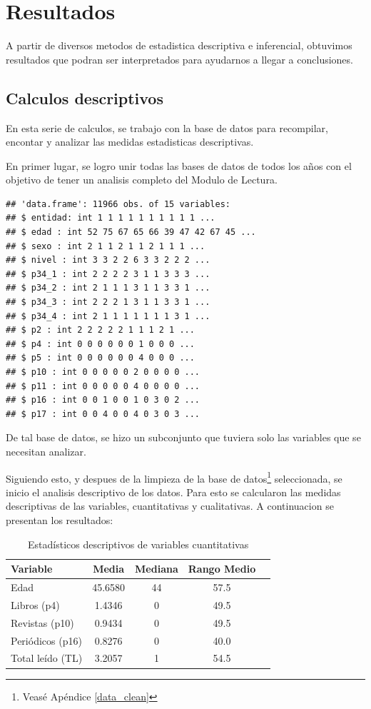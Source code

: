 \documentclass[aps,reprint]{revtex4-2}
\begin{document}
 

\section{Resultados}
A partir de diversos metodos de estadistica descriptiva e inferencial, obtuvimos resultados que podran ser interpretados para ayudarnos a llegar a conclusiones.

\subsection{Calculos descriptivos}

En esta serie de calculos, se trabajo con la base de datos para recompilar, encontar y analizar las medidas estadisticas descriptivas.

En primer lugar, se logro unir todas las bases de datos de todos los años con el objetivo de tener un analisis completo del Modulo de Lectura.

\begin{lstlisting}
## 'data.frame': 11966 obs. of 15 variables:
## $ entidad: int 1 1 1 1 1 1 1 1 1 1 ...
## $ edad : int 52 75 67 65 66 39 47 42 67 45 ...
## $ sexo : int 2 1 1 2 1 1 2 1 1 1 ...
## $ nivel : int 3 3 2 2 6 3 3 2 2 2 ...
## $ p34_1 : int 2 2 2 2 3 1 1 3 3 3 ...
## $ p34_2 : int 2 1 1 1 3 1 1 3 3 1 ...
## $ p34_3 : int 2 2 2 1 3 1 1 3 3 1 ...
## $ p34_4 : int 2 1 1 1 1 1 1 1 3 1 ...
## $ p2 : int 2 2 2 2 2 1 1 1 2 1 ...
## $ p4 : int 0 0 0 0 0 0 1 0 0 0 ...
## $ p5 : int 0 0 0 0 0 0 4 0 0 0 ...
## $ p10 : int 0 0 0 0 0 2 0 0 0 0 ...
## $ p11 : int 0 0 0 0 0 4 0 0 0 0 ...
## $ p16 : int 0 0 1 0 0 1 0 3 0 2 ...
## $ p17 : int 0 0 4 0 0 4 0 3 0 3 ...
\end{lstlisting}

De tal base de datos, se hizo un subconjunto que tuviera solo las variables que se necesitan analizar.

Siguiendo esto, y despues de la limpieza de la base de datos\footnote{Veasé Apéndice \ref{data_clean}} seleccionada, se inicio el analisis descriptivo de los datos. Para esto se calcularon las medidas descriptivas de las variables, cuantitativas y cualitativas. A continuacion se presentan los resultados:

\begin{table}[H]
\centering
\caption{Estadísticos descriptivos de variables cuantitativas}
\begin{tabular}{lcccc}
\toprule
\textbf{Variable} & \textbf{Media} & \textbf{Mediana} & \textbf{Rango Medio} \\
\midrule
Edad & 45.6580 & 44 & 57.5 \\
Libros (p4) & 1.4346 & 0 & 49.5 \\
Revistas (p10) & 0.9434 & 0 & 49.5 \\
Periódicos (p16) & 0.8276 & 0 & 40.0 \\
Total leído (TL) & 3.2057 & 1 & 54.5 \\
\bottomrule
\end{tabular}
\end{table}
\end{document}

